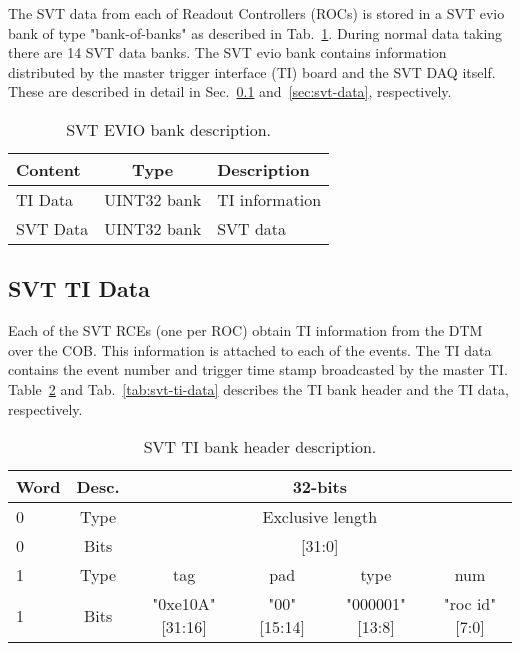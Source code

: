 \documentclass{desyproc}
\begin{document}
The SVT data from each of Readout Controllers (ROCs) is stored in a SVT evio bank of type "bank-of-banks" as 
described in Tab.~\ref{tab:svt-bank}. During normal data taking there are 14 SVT data banks. The SVT evio bank 
contains information distributed by the master trigger interface (TI) board and the SVT DAQ itself. These are described in 
detail in Sec.~\ref{sec:svt-ti-data} and~\ref{sec:svt-data}, respectively.

\begin{table}[]
  \begin{center}
    \caption{SVT EVIO bank description.}
    \label{tab:svt-bank}
    \begin{tabular}{|l|c|l|}
    \hline
    \bf Content & \bf Type & \bf Description\\
      \hline
      TI Data & UINT32 bank & TI information\\
      \hline
      SVT Data & UINT32 bank & SVT data\\
      \hline
      \end{tabular}
  \end{center}
\end{table}


\subsection{SVT TI Data}
\label{sec:svt-ti-data}
Each of the SVT RCEs (one per ROC) obtain TI information from the DTM over the COB. This information is 
attached to each of the events. The TI data contains the event number and trigger time stamp broadcasted by the 
master TI. Table~\ref{tab:svt-ti-header} and Tab.~\ref{tab:svt-ti-data} describes the TI bank header and the TI data, respectively.
\begin{table}[]
  \begin{center}
    \caption{SVT TI bank header description.}
    \label{tab:svt-ti-header}
    \begin{tabular}{|l|c|c|c|c|c|}
   	\hline
    	\bf Word & \bf Desc. & \multicolumn{4}{|c|}{\bf 32-bits}\\
      	\hline
    	 0 &  Type & \multicolumn{4}{|c|}{Exclusive length}\\
	\hline
    	 0 &  Bits & \multicolumn{4}{|c|}{[31:0]}\\
	\hline
    	 1 &  Type & tag & pad & type & num\\
	\hline
    	 1 &  Bits & "0xe10A" [31:16] & "00" [15:14] & "000001" [13:8] &  "roc id" [7:0]\\
	\hline
      \end{tabular}
  \end{center}
\end{table}
\end{document}
